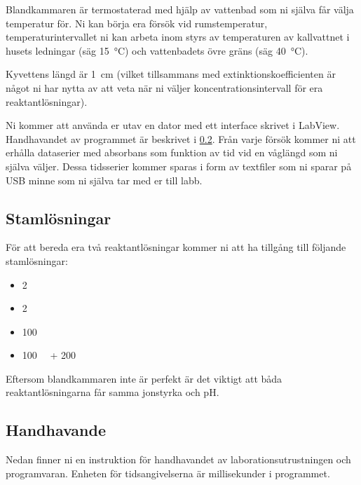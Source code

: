 Blandkammaren är termostaterad med hjälp av vattenbad som ni själva får
välja temperatur för. Ni kan börja era försök vid
rumstemperatur, temperaturintervallet ni kan arbeta inom styrs av
temperaturen av kallvattnet i husets ledningar (säg \SI{15}{\celsius})
och vattenbadets övre gräns (säg \SI{40}{\celsius}). 

Kyvettens längd är \SI{1}{\centi\metre} (vilket
tillsammans med extinktionskoefficienten  är något ni har nytta av att
veta när ni väljer koncentrationsintervall för era reaktantlösningar).

Ni kommer att använda er utav en dator med ett interface
skrivet i LabView. Handhavandet av programmet är beskrivet i
\cref{sec:handhavande}. Från varje försök kommer ni att erhålla dataserier med
absorbans som funktion av tid vid en våglängd som ni själva väljer. Dessa
tidsserier kommer sparas i form av textfiler som ni sparar på USB minne
som ni själva tar med er till labb.

\subsection{Stamlösningar}
För att bereda era två reaktantlösningar kommer ni att ha tillgång till följande
stamlösningar:

\begin{itemize}
\item \SI{2}{\Molar} 
\item \SI{2}{\Molar} 
\item \SI{100}{\milli\Molar} 
\item \SI{100}{\milli\Molar}  + \SI{200}{\milli\Molar} 
\end{itemize}

Eftersom blandkammaren inte är perfekt är det viktigt att båda
reaktantlösningarna får samma jonstyrka och pH.

\subsection{Handhavande}
\label{sec:handhavande}
Nedan finner ni en instruktion för handhavandet av
laborationsutrustningen och programvaran. Enheten för tidsangivelserna är
millisekunder i programmet.

